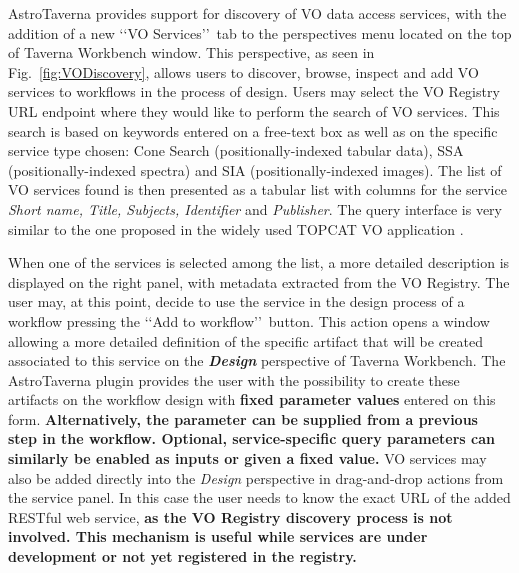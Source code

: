 \documentclass{aa}
\begin{document}
AstroTaverna provides support for discovery of VO data access services, with the addition of a new \lq\lq VO Services\rq\rq\ tab to the perspectives menu located on the top of Taverna Workbench window. This perspective, as seen in Fig.~\ref{fig:VODiscovery}, allows users to discover, browse, inspect and add VO services to workflows in the process of design. Users may select the VO Registry URL endpoint where they would like to perform the search of VO services. This search is based on keywords entered on a free-text box as well as on the specific service type chosen: Cone Search (positionally-indexed tabular data), SSA (positionally-indexed spectra) and SIA (positionally-indexed images). The list of VO services found is then presented as a tabular list with columns for the service \textit{Short name, Title, Subjects, Identifier} and \textit{Publisher}. The query interface is very similar to the one proposed in the widely used TOPCAT VO application \citep{Taylor2011}. 

When one of the services is selected among the list, a more detailed description is displayed on the right panel, with metadata extracted from the VO Registry. The user may, at this point, decide to use the service in the design process of a workflow pressing the \lq\lq Add to workflow\rq\rq\ button. This action opens a window allowing a more detailed definition of the specific artifact that will be created associated to this service on the \textbf{\emph{Design}} perspective of Taverna Workbench. The AstroTaverna plugin provides the user with the possibility to create these artifacts on the workflow design with \textbf{fixed parameter values} entered on this form. \textbf{Alternatively, the parameter can be supplied from a previous step in the workflow. Optional, service-specific query parameters can similarly be enabled as inputs or given a fixed value.} VO services may also be added directly into the \emph{Design} perspective in drag-and-drop actions from the service panel. In this case the user needs to know the exact URL of the added RESTful web service, \textbf{as the VO Registry discovery process is not involved. This mechanism is useful while services are under development or not yet registered in the registry.}
\end{document}
